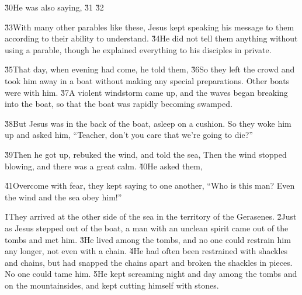 \v{30}He was also saying,  \v{31} \v{32}

\v{33}With many other parables like these, Jesus kept speaking his message to them according to their ability to understand. \v{34}He did not tell them anything without using a parable, though he explained everything to his disciples in private.

\v{35}That day, when evening had come, he told them,  \v{36}So they left the crowd and took him away in a boat without making any special preparations. Other boats were with him. \v{37}A violent windstorm came up, and the waves began breaking into the boat, so that the boat was rapidly becoming swamped.

\v{38}But Jesus was in the back of the boat, asleep on a cushion. So they woke him up and asked him, ``Teacher, don't you care that we're going to die?''

\v{39}Then he got up, rebuked the wind, and told the sea,  Then the wind stopped blowing, and there was a great calm. \v{40}He asked them, 

\v{41}Overcome with fear, they kept saying to one another, ``Who is this man? Even the wind and the sea obey him!''

\v{1}They arrived at the other side of the sea in the territory of the Gerasenes. \v{2}Just as Jesus stepped out of the boat, a man with an unclean spirit came out of the tombs and met him. \v{3}He lived among the tombs, and no one could restrain him any longer, not even with a chain. \v{4}He had often been restrained with shackles and chains, but had snapped the chains apart and broken the shackles in pieces. No one could tame him. \v{5}He kept screaming night and day among the tombs and on the mountainsides, and kept cutting himself with stones.

